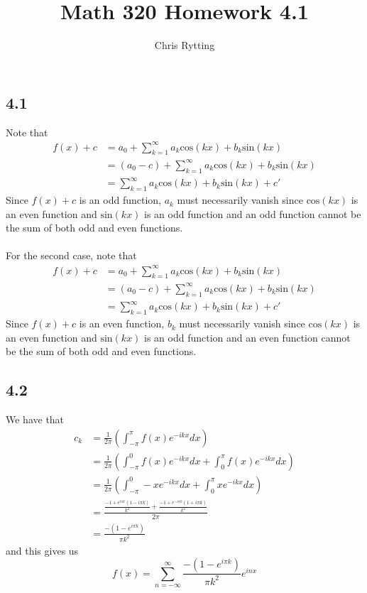 \documentclass[letterpaper,12pt]{article}
\theoremstyle{definition}
\begin{document}
\title{Math 320 Homework 4.1}
\author{Chris Rytting}
\maketitle

\subsection*{4.1}
Note that
\begin{align*}
f(x) + c &= a_0  + \sum^{\infty}_{k=1} a_k \text{cos}(kx) + b_k \text{sin} (kx)\\
&= (a_0 - c)  + \sum^{\infty}_{k=1} a_k \text{cos}(kx) + b_k \text{sin} (kx)\\
&=  \sum^{\infty}_{k=1} a_k \text{cos}(kx) + b_k \text{sin} (kx)+ c'
\end{align*}
Since $f(x) + c$ is an odd function, $a_k$ must necessarily vanish since $\text{cos}(kx)$ is an even function and $\text{sin} (kx) $ is an odd function and an odd function cannot be the sum of both odd and even functions. \\\\

For the second case, note that
\begin{align*}
f(x) + c &= a_0  + \sum^{\infty}_{k=1} a_k \text{cos}(kx) + b_k \text{sin} (kx)\\
&= (a_0 - c)  + \sum^{\infty}_{k=1} a_k \text{cos}(kx) + b_k \text{sin} (kx)\\
&=  \sum^{\infty}_{k=1} a_k \text{cos}(kx) + b_k \text{sin} (kx)+ c'
\end{align*}
Since $f(x) + c$ is an even function, $b_k$ must necessarily vanish since $\text{cos}(kx)$ is an even function and $\text{sin} (kx) $ is an odd function and an even function cannot be the sum of both odd and even functions. 

\subsection*{4.2}
We have that
\begin{align*}
    c_k &= \frac{1}{2\pi} \left( \int^{\pi}_{-\pi} f(x)e^{-ikx}  dx \right)\\
    &= \frac{1}{2\pi} \left( \int^{0}_{-\pi} f(x)e^{-ikx}  dx + \int^{\pi}_{0} f(x)e^{-ikx}  dx \right)\\
    &= \frac{1}{2\pi} \left( \int^{0}_{-\pi} -x e^{-ikx}  dx + \int^{\pi}_{0} x e^{-ikx}  dx \right)\\
    &= \frac{\frac{-1+e^{i \pi k} (1-i \pi k)}{k^2}+\frac{-1+e^{-i \pi k} (1+i \pi k)}{k^2}}{2 \pi}\\
    &= \frac{-(1 - e^{i \pi k})}{\pi k^2}
\end{align*}
and this gives us 
\[f(x) = \sum^{\infty}_{n=-\infty}  \frac{-(1 - e^{i \pi k})}{\pi k^2} e^{inx}\]
\end{document}
